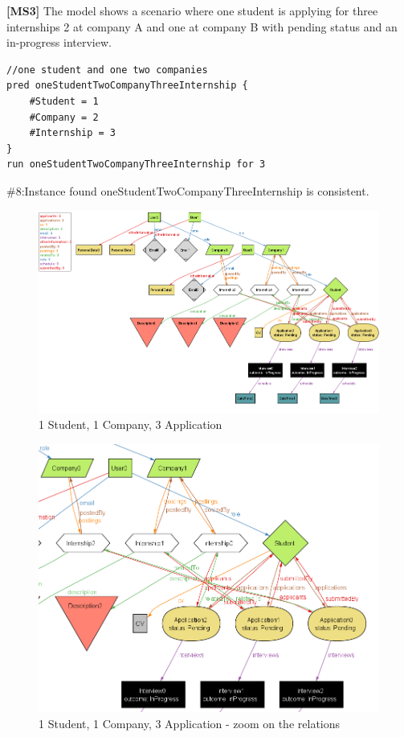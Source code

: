 \pagebreak
\textbf{[MS3]} The model shows a scenario where one student is applying for three internships 2 at company A and one at company B with pending status and an in-progress interview.
\begin{lstlisting}
//one student and one two companies
pred oneStudentTwoCompanyThreeInternship {
    #Student = 1
    #Company = 2
    #Internship = 3
}
run oneStudentTwoCompanyThreeInternship for 3 
\end{lstlisting}
{ \#8:Instance found oneStudentTwoCompanyThreeInternship is consistent.}
\begin{figure}[H]
    \centering
    \includegraphics[width=1\linewidth]{RASD//Images/1st2com.png}
    \caption{1 Student, 1 Company, 3 Application}
    \label{fig:enter-label}
\end{figure}
\begin{figure}[H]
    \centering
    \includegraphics[width=0.75\linewidth]{RASD//Images/1st2comzoom.png}
    \caption{1 Student, 1 Company, 3 Application - zoom on the relations}
    \label{fig:enter-label}
\end{figure}

